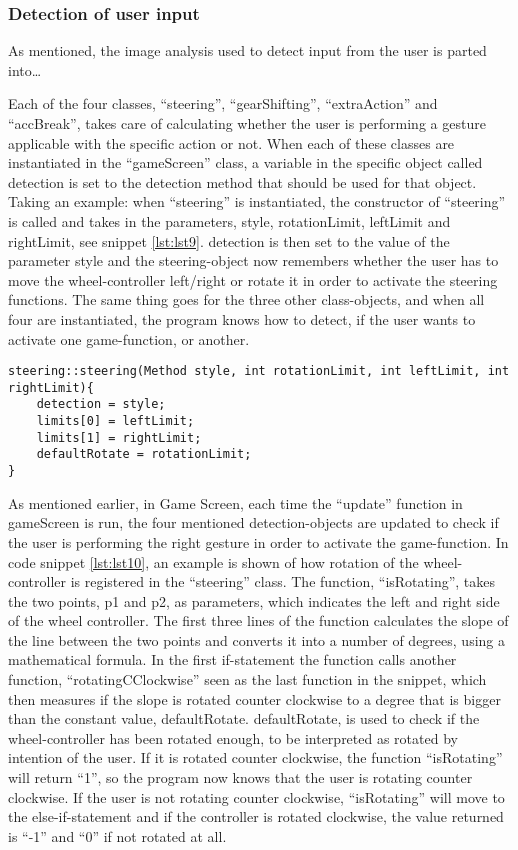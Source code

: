 \subsubsection*{Detection of user input}
As mentioned, the image analysis used to detect input from the user is parted into\dots

Each of the four classes, “steering”, “gearShifting”, “extraAction” and “accBreak”, takes care of calculating whether the user is performing a gesture applicable with the specific action or not. 
When each of these classes are instantiated in the “gameScreen” class, a variable in the specific object called detection is set to the detection method that should be used for that object. 
Taking an example: when “steering” is instantiated, the constructor of “steering” is called and takes in the parameters, style, rotationLimit, leftLimit and rightLimit, see snippet \ref{lst:lst9}. 
detection is then set to the value of the parameter style and the steering-object now remembers whether the user has to move the wheel-controller left/right or rotate it in order to activate the steering functions. 
The same thing goes for the three other class-objects, and when all four are instantiated, the program knows how to detect, if the user wants to activate one game-function, or another.
\bigskip

\begin{lstlisting}[caption=steering constructor, label=lst:lst9]
steering::steering(Method style, int rotationLimit, int leftLimit, int rightLimit){
    detection = style;
    limits[0] = leftLimit;
    limits[1] = rightLimit;
    defaultRotate = rotationLimit;
}
\end{lstlisting}

As mentioned earlier, in Game Screen, each time the “update” function in gameScreen is run, the four mentioned detection-objects are updated to check if the user is performing the right gesture in order to activate the game-function. 
In code snippet \ref{lst:lst10}, an example is shown of how rotation of the wheel-controller is registered in the “steering” class.
The function, “isRotating”, takes the two points, p1 and p2, as parameters, which indicates the left and right side of the wheel controller. 
The first three lines of the function calculates the slope of the line between the two points and converts it into a number of degrees, using a mathematical formula. 
In the first if-statement the function calls another function, “rotatingCClockwise” seen as the last function in the snippet, which then measures if the slope is rotated counter clockwise to a degree that is bigger than the constant value, defaultRotate. 
defaultRotate, is used to check if the wheel-controller has been rotated enough, to be interpreted as rotated by intention of the user. 
If it is rotated counter clockwise, the function “isRotating” will return “1”, so the program now knows that the user is rotating counter clockwise. 
If the user is not rotating counter clockwise, “isRotating” will move to the else-if-statement and if the controller is rotated clockwise, the value returned is “-1” and “0” if not rotated at all.

